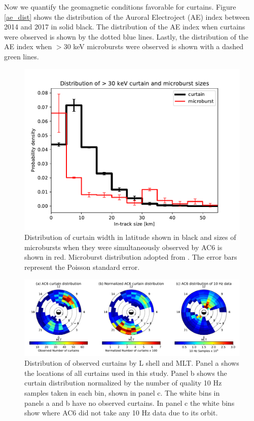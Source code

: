 \documentclass[draft]{agujournal2019}
\begin{document}
Now we quantify the geomagnetic conditions favorable for curtains. Figure \ref{ae_dist} shows the distribution of the Auroral Electroject (AE) index between 2014 and 2017 in solid black. The distribution of the AE index when curtains were observed is shown by the dotted blue lines. Lastly, the distribution of the AE index when $> 30$ keV microbursts were observed is shown with a dashed green lines. 

\begin{figure}
\includegraphics[width=\textwidth]{ac6_curtain_microburst_width_dist.pdf}
\caption{Distribution of curtain width in latitude shown in black and sizes of microbursts when they were simultaneously observed by AC6 is shown in red. Microburst distribution adopted from . The error bars represent the Poisson standard error.}
\label{width_dist}
\end{figure}

\begin{figure}
\includegraphics[width=\textwidth]{fig2_2.pdf}
\caption{Distribution of observed curtains by L shell and MLT. Panel a shows the locations of all curtains used in this study. Panel b shows the curtain distribution normalized by the number of quality 10 Hz samples taken in each bin, shown in panel c. The white bins in panels a and b have no observed curtains. In panel c the white bins show where AC6 did not take any 10 Hz data due to its orbit.}
\label{l_mlt_dist}
\end{figure}
\end{document}

